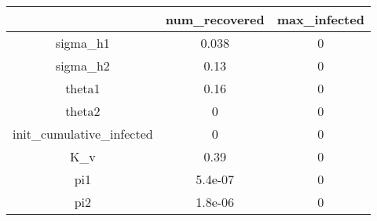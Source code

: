 \begin{tabular}{|c|c|c|}
\hline
& num_recovered & max_infected \\
\hline
sigma_h1 & 0.038 & 0 \\
\hline
sigma_h2 & 0.13 & 0 \\
\hline
theta1 & 0.16 & 0 \\
\hline
theta2 & 0 & 0 \\
\hline
init_cumulative_infected & 0 & 0 \\
\hline
K_v & 0.39 & 0 \\
\hline
pi1 & 5.4e-07 & 0 \\
\hline
pi2 & 1.8e-06 & 0 \\
\hline
\end{tabular}
